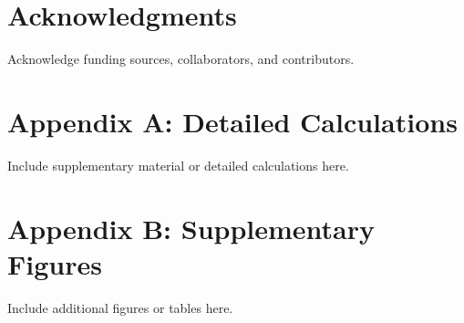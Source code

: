 \documentclass[12pt]{article}
\begin{document}
\section{Acknowledgments}
Acknowledge funding sources, collaborators, and contributors.


\appendix
\section{Appendix A: Detailed Calculations}
Include supplementary material or detailed calculations here.

\section{Appendix B: Supplementary Figures}
Include additional figures or tables here.

\end{document}
